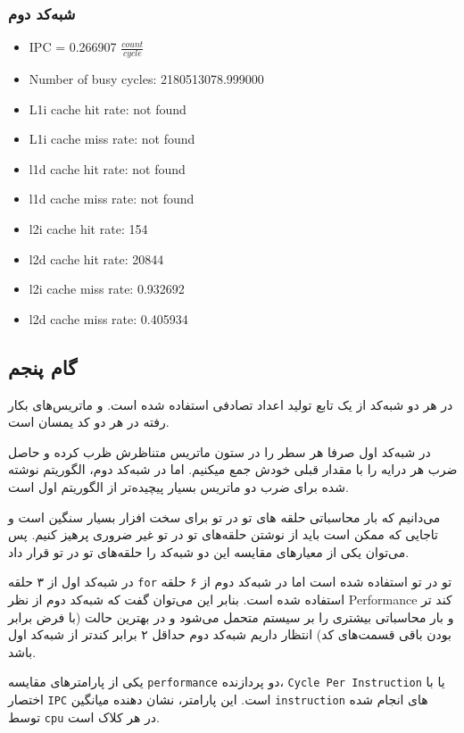 \documentclass[12pt]{exam}
\begin{document}
\begin{multicols}{1}
	
	
	\subsubsection{شبه‌کد دوم}
	\begin{latin}
		\begin{itemize}
			\item IPC = 0.266907 $\frac{count}{cycle}$
			\item Number of busy cycles: 2180513078.999000
			\item L1i cache hit rate: not found
			\item L1i cache miss rate: not found
			\item l1d cache hit rate: not found
			\item l1d cache miss rate: not found
			\item l2i cache hit rate: 154
			\item l2d cache hit rate: 20844
			\item l2i cache miss rate: 0.932692
			\item l2d cache miss rate: 0.405934
		\end{itemize}
	\end{latin}
	
	
	\subsection{گام پنجم}
	در هر دو شبه‌کد از یک تابع تولید اعداد تصادفی استفاده شده است. و ماتریس‌های بکار رفته در هر دو کد یمسان است.
	
	در شبه‌کد اول صرفا هر سطر را در ستون ماتریس متناظرش ظرب کرده و حاصل ضرب هر درایه را با مقدار قبلی خودش جمع میکنیم. اما در شبه‌کد دوم، الگوریتم نوشته شده برای ضرب دو ماتریس بسیار پیچیده‌تر از الگوریتم اول است.
	
	می‌دانیم که بار محاسباتی حلقه های تو در تو برای سخت افزار بسیار سنگین است و تاجایی که ممکن است باید از نوشتن حلقه‌های تو در تو غیر ضروری پرهیز کنیم. پس می‌توان یکی از معیار‌های مقایسه این دو شبه‌کد را حلقه‌های تو در تو قرار داد.
	
	در شبه‌کد اول از ۳ حلقه \texttt{for} تو در تو استفاده شده است اما در شبه‌کد دوم از ۶ حلقه استفاده شده است. بنابر این می‌توان گفت که شبه‌کد دوم از نظر Performance کند تر و بار محاسباتی بیشتری را بر سیستم متحمل می‌شود و در بهترین حالت (با فرض برابر بودن باقی قسمت‌های کد) انتظار داریم شبه‌کد دوم حداقل ۲ برابر کند‌تر از شبه‌کد اول باشد.
	
	
	یکی از پارامتر‌های مقایسه \texttt{performance} دو پردازنده، \texttt{Cycle Per Instruction}
	یا با اختصار \texttt{IPC} است.
	این پارامتر، نشان دهنده میانگین \texttt{instruction} های انجام شده توسط \texttt{cpu} در هر کلاک است.
	

\end{multicols}
\end{document}
